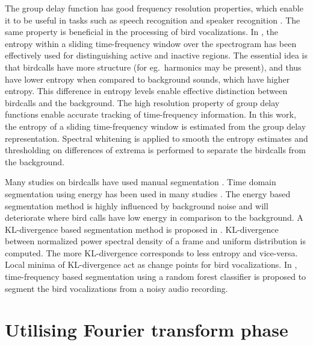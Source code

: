 \documentclass[a4paper]{article}
\begin{document}
The group delay function has good frequency resolution properties, which enable
it to be useful in tasks such as speech recognition and speaker recognition
\cite{hema} \cite{padman} \cite{modgdf}. The same property is beneficial in the
processing of bird vocalizations. In \cite{wang2013}, the entropy within a
sliding time-frequency window over the spectrogram has been effectively used for
distinguishing active and inactive regions. The essential idea is that birdcalls
have more structure (for eg.~harmonics may be present), and thus have lower
entropy when compared to background sounds, which have higher entropy. This
difference in entropy levels enable effective distinction between birdcalls and
the background.
The high resolution property of group delay functions enable accurate tracking
of time-frequency information. In this work, the entropy of a sliding
time-frequency window is estimated from the group delay representation. Spectral
whitening is applied to smooth the entropy estimates and thresholding on
differences of extrema is performed to separate the birdcalls from the
background.

Many studies on birdcalls have used manual segmentation \cite{Trifa} \cite{Lee}
\cite{Kaewtip}. Time domain segmentation using energy has been used in many
studies \cite{Harma} \cite{Somervuo} \cite{Fagerlund} . The energy  based
segmentation method is highly influenced by background noise and will
deteriorate  where bird calls have low energy in comparison to the background. A
KL-divergence based segmentation method is proposed in \cite{Lakshmi}.
KL-divergence between normalized power spectral density of a frame and uniform
distribution is computed. The more KL-divergence corresponds to less entropy and
vice-versa. Local minima of KL-divergence act as change points for bird
vocalizations. In \cite{Neal}, time-frequency based segmentation using a random
forest classifier is proposed to  segment the bird vocalizations from a noisy
audio recording. 

\section{Utilising Fourier transform phase}
\end{document}
